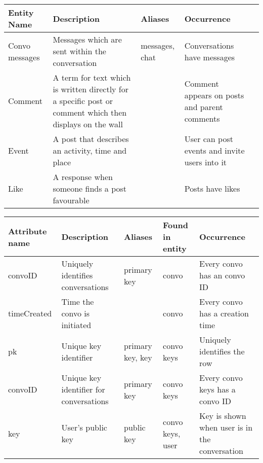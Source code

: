 \begin{landscape}
    \begin{tabular}{| p{2cm} | p{4cm} | p{5cm} | p{7cm} | p{12cm} |}
    \hline
    Entity Name      & Description                                                                                              & Aliases                             & Occurrence                                     \\ \hline
    Convo messages   & Messages which are sent within the conversation                                        & messages, chat                              &  Conversations have messages       \\ \hline
    Comment          & A term for text which is written directly for a specific post or comment which then displays on the wall &                                     & Comment appears on posts and parent comments  \\ \hline 
    Event            & A post that describes an activity, time and place                                                        &                                     & User can post events and invite users into it \\ \hline
    Like             & A response when someone finds a post favourable                                                          &                                     & Posts have likes                              \\ \hline
    \hline
    \end{tabular}

    \begin{tabular}{| p{2cm} | p{4cm} | p{3cm} | p{3cm} | p{6cm} |}
    \hline
    Attribute name         & Description                             & Aliases             & Found in entity            & Occurrence          \\ \hline

    convoID 	 & Uniquely identifies conversations & primary key & convo & Every convo has an convo ID     \\ \hline
    timeCreated  & Time the convo is initiated       &             & convo & Every convo has a creation time \\ \hline

    pk 			 & Unique key identifier			       & primary key, key & convo keys       & Uniquely identifies the row                   \\ \hline
    convoID		 & Unique key identifier for conversations & primary key      & convo keys       & Every convo keys has a convo ID               \\ \hline
    key          & User's public key 					   & public key       & convo keys, user & Key is shown when user is in the conversation \\ \hline


\end{tabular}
\end{landscape}
